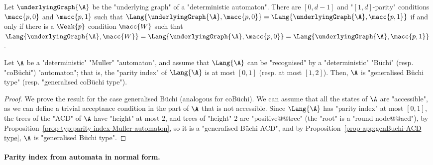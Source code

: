 \documentclass{theoretics}
\begin{document}
\begin{corollary}
	Let $\underlyingGraph{\A}$ be the "underlying graph" of a "deterministic automaton". There are $[0,d-1]$ and "$[1,d]$-parity" conditions $\macc{p,0}$ and $\macc{p,1}$ such that $\Lang{\underlyingGraph{\A},\macc{p,0}} = \Lang{\underlyingGraph{\A},\macc{p,1}}$ if and only if there is a $\Weak{p}$ condition $\macc{W}$ such that $\Lang{\underlyingGraph{\A},\macc{W}} =\Lang{\underlyingGraph{\A},\macc{p,0}} = \Lang{\underlyingGraph{\A},\macc{p,1}}$.
\end{corollary}


\begin{proposition}
	Let $\A$ be a "deterministic" "Muller" "automaton", and assume that $\Lang{\A}$ can be "recognised" by a "deterministic" "B\"uchi" (resp. "coB\"uchi") "automaton"; that is, the "parity index" of $\Lang{\A}$ is at most $[0,1]$ (resp. at most $[1,2]$). Then, $\A$ is "generalised B\"uchi type" (resp. "generalised coB\"uchi type").
\end{proposition}
\begin{proof}
	We prove the result for the case generalised B\"uchi (analogous for coB\"uchi). We can assume that all the states of $\A$ are "accessible", as we can define a trivial acceptance condition in the part of $\A$ that is not accessible.  Since $\Lang{\A}$ has "parity index" at most $[0,1]$, the trees of the "ACD" of $\A$ have "height" at most $2$, and trees of "height" $2$ are "positive@@tree" (the "root" is a "round node@@acd"), by Proposition~\ref{prop-typ:parity index-Muller-automaton}, so it is a "generalised B\"uchi ACD", and by Proposition~\ref{prop-app:genBuchi-ACD type}, $\A$ is "generalised B\"uchi type".
\end{proof}


\paragraph*{Parity index from automata in normal form.}
\end{document}
